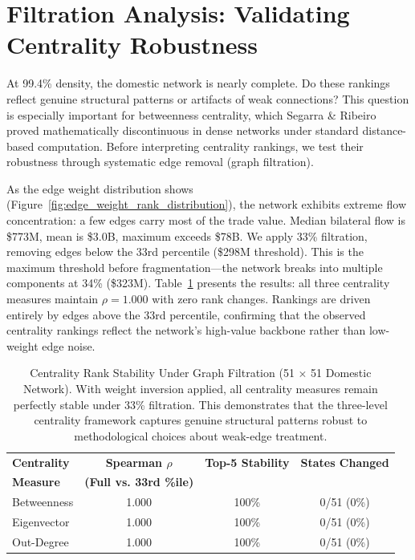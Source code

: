 \documentclass[12pt,oneside]{book}
\begin{document}
\section{Filtration Analysis: Validating Centrality Robustness}
\label{sec:filtration}

At 99.4\% density, the domestic network is nearly complete. Do these rankings reflect genuine structural patterns or artifacts of weak connections?
This question is especially important for betweenness centrality, which Segarra \& Ribeiro \cite{segarra_stability_2015} proved mathematically discontinuous in dense networks under standard distance-based computation. Before interpreting centrality rankings, we test their robustness through systematic edge removal (graph filtration). 

As the edge weight distribution shows (Figure~\ref{fig:edge_weight_rank_distribution}), the network exhibits extreme flow concentration: a few edges carry most of the trade value. Median bilateral flow is \$773M, mean is \$3.0B, maximum exceeds \$78B. We apply 33\% filtration, removing edges below the 33rd percentile (\$298M threshold). This is the maximum threshold before fragmentation---the network breaks into multiple components at 34\% (\$323M). Table~\ref{tab:filtration_sensitivity} presents the results: all three centrality measures maintain $\rho = 1.000$ with zero rank changes. Rankings are driven entirely by edges above the 33rd percentile, confirming that the observed centrality rankings reflect the network's high-value backbone rather than low-weight edge noise. 

\begin{table}[ht]
\centering
\caption[Centrality Rank Stability Under Graph Filtration (51 $\times$ 51 Domestic Network).]{Centrality Rank Stability Under Graph Filtration (51 $\times$ 51 Domestic Network). With weight inversion applied, all centrality measures remain perfectly stable under 33\% filtration. This demonstrates that the three-level centrality framework captures genuine structural patterns robust to methodological choices about weak-edge treatment.}
\label{tab:filtration_sensitivity}
\begin{tabular}{lccc}
\hline
\textbf{Centrality} & \textbf{Spearman $\rho$} & \textbf{Top-5 Stability} & \textbf{States Changed} \\
\textbf{Measure} & \textbf{(Full vs. 33rd \%ile)} & & \\
\hline
Betweenness   &  1.000  & 100\% &  0/51 (0\%) \\
Eigenvector   &  1.000  & 100\% &  0/51 (0\%) \\
Out-Degree    &  1.000  & 100\% &  0/51 (0\%) \\
\hline
\end{tabular}
\end{table}
\end{document}
